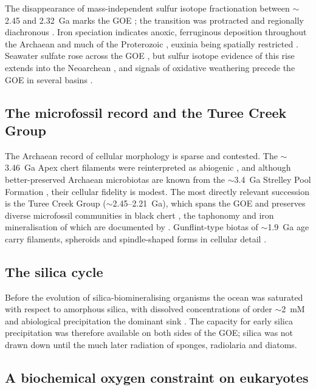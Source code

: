 \documentclass[11pt]{article}
\begin{document}
The disappearance of mass-independent sulfur isotope fractionation between $\sim$2.45 and 2.32~Ga
marks the GOE \citep{Holland2006,Bekker2004,Pavlov2002,Farquhar2000}; the transition was protracted
and regionally diachronous \citep{Lyons2014,Philippot2018}. Iron speciation indicates anoxic,
ferruginous deposition throughout the Archaean and much of the Proterozoic
\citep{Canfield1998,Poulton2005,Poulton2011}, euxinia being spatially restricted
\citep{Reinhard2009}. Seawater sulfate rose across the GOE \citep{Habicht2002,Kah2004,Crowe2014},
but sulfur isotope evidence of this rise extends into the Neoarchean \citep{Reinhard2009}, and
signals of oxidative weathering precede the GOE in several basins \citep{Anbar2007}.

\subsection{The microfossil record and the Turee Creek Group}

The Archaean record of cellular morphology is sparse and contested. The $\sim$3.46~Ga Apex chert
filaments \citep{Schopf1993} were reinterpreted as abiogenic \citep{Brasier2002}, and although
better-preserved Archaean microbiotas are known from the $\sim$3.4~Ga Strelley Pool Formation
\citep{Sugitani2010,Delarue2020}, their cellular fidelity is modest. The most directly relevant
succession is the Turee Creek Group ($\sim$2.45--2.21~Ga), which spans the GOE and preserves diverse
microfossil communities in black chert \citep{Barlow2018}, the taphonomy and iron mineralisation of
which are documented by \citet{Lepot2017b}. Gunflint-type biotas of $\sim$1.9~Ga age carry
filaments, spheroids and spindle-shaped forms in cellular detail \citep{Lepot2017a,Javaux2018}.

\subsection{The silica cycle}

Before the evolution of silica-biomineralising organisms the ocean was saturated with respect to
amorphous silica, with dissolved concentrations of order $\sim$2~mM and abiological precipitation
the dominant sink \citep{Siever1992,Perry2007}. The capacity for early silica precipitation was
therefore available on both sides of the GOE; silica was not drawn down until the much later
radiation of sponges, radiolaria and diatoms.

\subsection{A biochemical oxygen constraint on eukaryotes}
\end{document}
